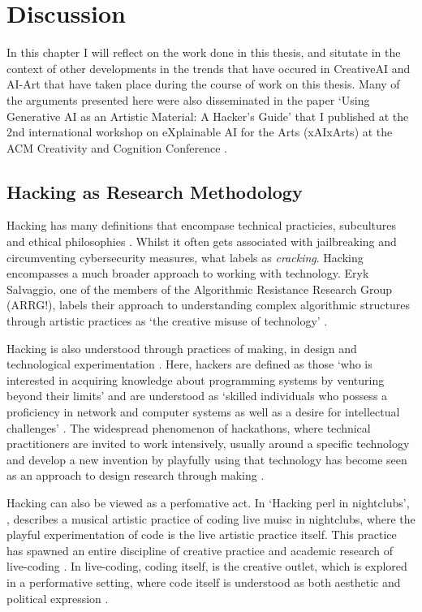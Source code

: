\chapter{Discussion}
\label{ch:discussion}

In this chapter I will reflect on the work done in this thesis, and situtate in the context of other developments in the trends that have occured in CreativeAI and AI-Art that have taken place during the course of work on this thesis. 
Many of the arguments presented here were also disseminated in the paper `Using Generative AI as an Artistic Material: A Hacker's Guide’ that I published at the 2nd international workshop on eXplainable AI for the Arts (xAIxArts) at the ACM Creativity and Cognition Conference \citep{broad2024using}.


\section{Hacking as Research Methodology}

Hacking has many definitions that encompase technical practicies, subcultures and ethical philosophies \citep{jordan2017genealogy}. 
Whilst it often gets associated with jailbreaking and circumventing cybersecurity measures, what \citep{stallman2002hacking} labels as \textit{cracking}.
Hacking encompasses a much broader approach to working with technology.
Eryk Salvaggio, one of the members of the Algorithmic Resistance Research Group (ARRG!), labels their approach to understanding complex algorithmic structures through artistic practices as `the creative misuse of technology' \citep{salvaggio2023cultural}.

Hacking is also understood through practices of making, in design and technological experimentation \citep{hunsinger2016democratization}.
Here, hackers are defined as those `who is interested in acquiring knowledge about programming systems by venturing beyond their limits' and are understood as `skilled individuals who possess a proficiency in network and computer systems as well as a desire for intellectual challenges' \citep{richterich2017introduction}.
The widespread phenomenon of hackathons, where technical practitioners are invited to work intensively, usually around a specific technology and develop a new invention by playfully using that technology has become seen as an approach to design research through making \citep{flus2021design, falk2022future, rys2023invention}.

Hacking can also be viewed as a perfomative act. In `Hacking perl in nightclubs', \cite{mclean2004hacking}, describes a musical artistic practice of coding live muisc in nightclubs, where the playful experimentation of code is the live artistic practice itself. 
This practice has spawned an entire discipline of creative practice and academic research of live-coding \citep{selvaraj2021live}.
In live-coding, coding itself, is the creative outlet, which is explored in a performative setting, where code itself is understood as both aesthetic and political expression \citep{cox2012speaking}.

